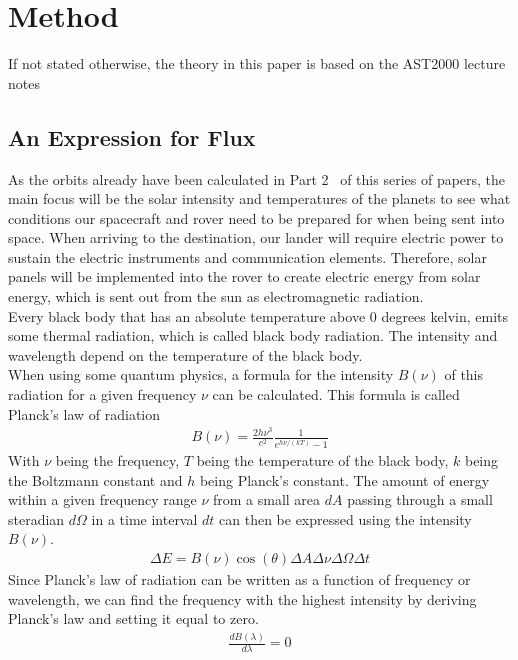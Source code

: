 \documentclass[reprint,english,notitlepage]{revtex4-2}
\begin{document}
\section{Method} \label{sec:method}
If not stated otherwise, the theory in this paper is based on the AST2000 lecture notes~\parencite[][]{lecture_notes_part1d}
\subsection{An Expression for Flux}\label{subsec:an-expression-for-flux}
As the orbits already have been calculated in Part 2~\parencite[][]{part2}
of this series of papers, the main focus will be the solar intensity and temperatures of the planets to see what conditions our spacecraft and rover need to be prepared for when being sent into space.
When arriving to the destination, our lander will require electric power to sustain the electric instruments and communication elements.
Therefore, solar panels will be implemented into the rover to create electric energy from solar energy, which is sent out from the sun as electromagnetic radiation.\\
Every black body that has an absolute temperature above 0 degrees kelvin, emits some thermal radiation, which is called black body radiation.
The intensity and wavelength depend on the temperature of the black body.\\
When using some quantum physics, a formula for the intensity $B(\nu)$ of this radiation for a given frequency $\nu$ can be calculated.
This formula is called Planck's law of radiation
\begin{align*}
    B(\nu) = \frac{2h\nu^3}{c^2}\frac{1}{e^{h\nu/(kT)}-1}
\end{align*}
With $\nu$ being the frequency, $T$ being the temperature of the black body, $k$ being the Boltzmann constant and $h$ being Planck's constant.
The amount of energy within a given frequency range $\nu$ from a small area $dA$ passing through a small steradian $d\Omega$ in a time interval $dt$ can then be expressed using the intensity $B(\nu)$.
\begin{align*}
    \Delta E = B(\nu) \cos\left(\theta\right) \Delta A \Delta\nu \Delta\Omega \Delta t
\end{align*}
Since Planck's law of radiation can be written as a function of frequency or wavelength, we can find the frequency with the highest intensity by deriving Planck's law and setting it equal to zero.
\begin{align*}
	\frac{dB(\lambda)}{d\lambda} = 0
\end{align*}\\
\end{document}
